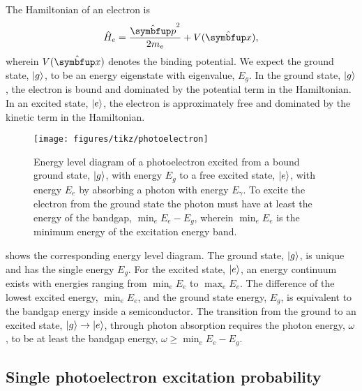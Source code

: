 The Hamiltonian of an electron is
\begin{equation}
	\hat{H}_e
	=
	\frac{\vu{p}^2}{2m_e}
	+
	V(\vu{x})
	,
\end{equation}
wherein $V(\vu{x})$ denotes the binding potential.
We expect the ground state, $\lvert g\rangle$, to be an energy eigenstate with eigenvalue, $E_g$.
In the ground state, $\lvert g\rangle$, the electron is bound and dominated by the potential term in the Hamiltonian.
In an excited state, $\lvert e\rangle$, the electron is approximately free and dominated by the kinetic term in the Hamiltonian.
\begin{figure}[htb]
    \centering
    \texttt{[image: figures/tikz/photoelectron]}
    \caption{Energy level diagram of a photoelectron excited from a bound ground state, $\lvert g\rangle$, with energy $E_g$ to a free excited state, $\lvert e\rangle$, with energy $E_e$ by absorbing a photon with energy $E_\gamma$. To excite the electron from the ground state the photon must have at least the energy of the bandgap, $\min_eE_e-E_g$, wherein $\min_eE_e$ is the minimum energy of the excitation energy band.}\label{fig:photoelectron}
\end{figure}
 shows the corresponding energy level diagram.
The ground state, $\lvert g\rangle$, is unique and has the single energy $E_g$.
For the excited state, $\lvert e\rangle$, an energy continuum exists with energies ranging from $\min_eE_e$ to $\max_eE_e$.
The difference of the lowest excited energy, $\min_eE_e$, and the ground state energy, $E_g$, is equivalent to the bandgap energy inside a semiconductor.
The transition from the ground to an excited state, $\lvert g\rangle\to\lvert e\rangle$, through photon absorption requires the photon energy, $\omega$, to be at least the bandgap energy, $\omega\geq\min_eE_e-E_g$.

\subsection{Single photoelectron excitation probability}

